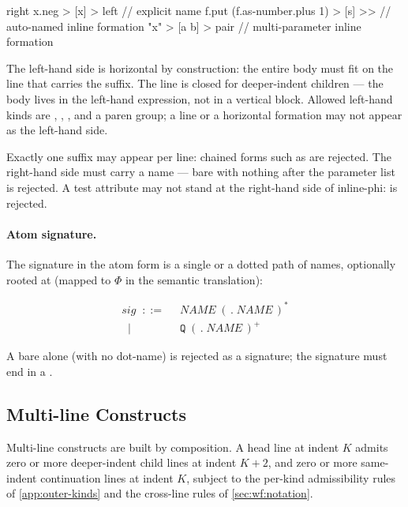 \begin{ffcode}
right x.neg > [x] > left              // explicit name
f.put (f.as-number.plus 1) > [s] >>   // auto-named inline formation
"x" > [a b] > pair                    // multi-parameter inline formation
\end{ffcode}

The left-hand side is horizontal by construction: the entire body must fit
  on the line that carries the suffix.
The line is closed for deeper-indent children ---
  the body lives in the left-hand expression, not in a vertical block.
Allowed left-hand kinds are , , ,
  and a paren group; a  line or a horizontal
  formation may not appear as the left-hand side.

Exactly one \ff{> [params]} suffix may appear per line:
  chained forms such as  are rejected.
The right-hand side must carry a name --- bare \ff{> [params]} with
  nothing after the parameter list is rejected.
A test attribute may not stand at the right-hand side of inline-phi:
   is rejected.

\paragraph{Atom signature.}
The signature  in the atom form  is a single
   or a dotted path of names, optionally rooted at 
  (mapped to \(\Phi\) in the semantic translation):

\begin{align*}
\mathit{sig}\;\;::=\;\;& \mathit{NAME}\;(\,\mathtt{.}\;\mathit{NAME}\,)^{*}\\
\;\;|\;\;& \mathtt{Q}\;(\,\mathtt{.}\;\mathit{NAME}\,)^{+}
\end{align*}

A bare  alone (with no dot-name) is rejected as a signature;
  the signature must end in a .

\subsection{Multi-line Constructs}\label{sec:syntax:multi-line}

Multi-line constructs are built by composition.
A head line at indent \(K\) admits zero or more deeper-indent child lines
  at indent \(K+2\), and zero or more same-indent continuation lines at
  indent \(K\), subject to the per-kind admissibility rules of
  \cref{app:outer-kinds} and the cross-line rules of \cref{sec:wf:notation}.

